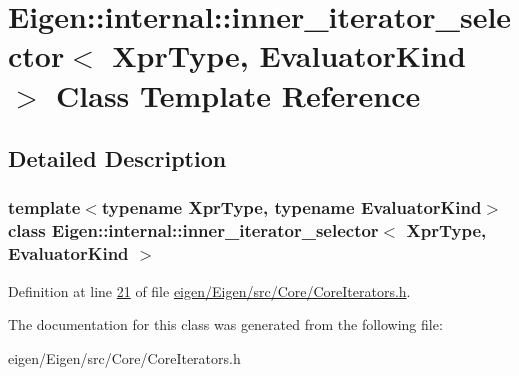 \hypertarget{class_eigen_1_1internal_1_1inner__iterator__selector}{}\section{Eigen\+:\+:internal\+:\+:inner\+\_\+iterator\+\_\+selector$<$ Xpr\+Type, Evaluator\+Kind $>$ Class Template Reference}
\label{class_eigen_1_1internal_1_1inner__iterator__selector}


\subsection{Detailed Description}
\subsubsection*{template$<$typename Xpr\+Type, typename Evaluator\+Kind$>$\newline
class Eigen\+::internal\+::inner\+\_\+iterator\+\_\+selector$<$ Xpr\+Type, Evaluator\+Kind $>$}



Definition at line \hyperlink{eigen_2_eigen_2src_2_core_2_core_iterators_8h_source_l00021}{21} of file \hyperlink{eigen_2_eigen_2src_2_core_2_core_iterators_8h_source}{eigen/\+Eigen/src/\+Core/\+Core\+Iterators.\+h}.



The documentation for this class was generated from the following file\+:\begin{DoxyCompactItemize}
\item 
eigen/\+Eigen/src/\+Core/\+Core\+Iterators.\+h\end{DoxyCompactItemize}
